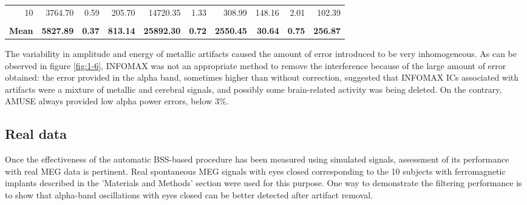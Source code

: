 \begin{table}[ht!]
\begin{tabular}{rrrrrrrrrr}
10                   & 3764.70                                              & 0.59                 & 205.70               & 14720.35                                             & 1.33                 & 308.99               & 148.16                                                   & 2.01                 & 102.39               \\
\multicolumn{1}{l}{} & \multicolumn{1}{l}{}                                 & \multicolumn{1}{l}{} & \multicolumn{1}{l}{} & \multicolumn{1}{l}{}                                 & \multicolumn{1}{l}{} & \multicolumn{1}{l}{} & \multicolumn{1}{l}{}                                     & \multicolumn{1}{l}{} & \multicolumn{1}{l}{} \\
\textbf{Mean}        & \textbf{5827.89}                                     & \textbf{0.37}        & \textbf{813.14}      & \textbf{25892.30}                                    & \textbf{0.72}        & \textbf{2550.45}     & \textbf{30.64}                                           & \textbf{0.75}        & \textbf{256.87}     
\end{tabular}
\end{table}

The variability in amplitude and energy of metallic artifacts caused the amount of error introduced to be very inhomogeneous. As can be observed in figure \ref{fig:1-6}, INFOMAX was not an appropriate method to remove the interference because of the large amount of error obtained: the error provided in the alpha band, sometimes higher than without correction, suggested that INFOMAX ICs associated with artifacts were a mixture of metallic and cerebral signals, and possibly some brain-related activity was being deleted. On the contrary, AMUSE always provided low alpha power errors, below 3\%.

\subsection{Real data}

Once the effectiveness of the automatic BSS-based procedure has been measured using simulated signals, assessment of its performance with real MEG data is pertinent. Real spontaneous MEG signals with eyes closed corresponding to the 10 subjects with ferromagnetic implants described in the 'Materials and Methods' section were used for this purpose. One way to demonstrate the filtering performance is to show that alpha-band oscillations with eyes closed can be better detected after artifact removal.

